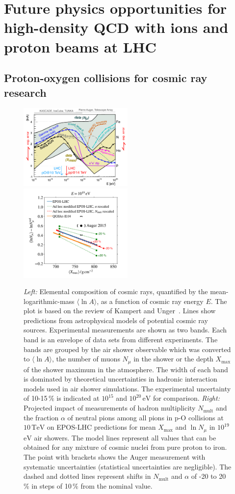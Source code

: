 \documentclass[../report.tex]{subfiles}
\newcommand{\mlna}{\langle \ln\!A \rangle}
\newcommand{\nmu}{N_\mu}
\newcommand{\lnnmu}{\ln\!\nmu}
\newcommand{\xmax}{X_\text{max}}
\newcommand{\nmult}{N_\text{mult}}
\newcommand{\si}[1]{\ensuremath{\text{#1}}}
\newcommand{\SI}[2]{\ensuremath{#1\,\si{#2}}}
\begin{document}
\section{Future physics opportunities for high-density QCD with ions and proton beams at LHC}


\subsection{Proton-oxygen collisions for cosmic ray research}

\begin{figure}
\includegraphics[width=0.5\textwidth,trim=5 -5 20 0]{figs/lna_uncertainty.pdf}
\includegraphics[width=0.5\textwidth,trim=-20 0 30 0]{figs/epos_mod.pdf}
\caption{\emph{Left:} Elemental composition of cosmic rays, quantified by the mean-logarithmic-mass $\mlna$, as a function of cosmic ray energy $E$. The plot is based on the review of Kampert and Unger~\cite{kampert_cr_review}. Lines show predictions from astrophysical models of potential cosmic ray sources. Experimental measurements are shown as two bands. Each band is an envelope of data sets from different experiments. The bands are grouped by the air shower observable which was converted to $\mlna$, the number of muons $\nmu$ in the shower or the depth $\xmax$ of the shower maximum in the atmosphere. The width of each band is dominated by theoretical uncertainties in hadronic interaction models used in air shower simulations. The experimental uncertainty of 10-15\,\% is indicated at $10^{15}$ and $10^{20}$\,\si{eV} for comparison. \emph{Right:} Projected impact of measurements of hadron multiplicity $\nmult$ and the fraction $\alpha$ of neutral pions among all pions in p-O collisions at \SI{10}{TeV} on EPOS-LHC predictions for mean $\xmax$ and $\lnnmu$ in $10^{19}$\,\si{eV} air showers. The model lines represent all values that can be obtained for any mixture of cosmic nuclei from pure proton to iron. The point with brackets shows the Auger measurement with systematic uncertainties (statistical uncertainties are negligible). The dashed and dotted lines represent shifts in $\nmult$ and $\alpha$ of -20 to 20\,\% in steps of 10\,\% from the nominal value.}

\end{figure}
\end{document}
